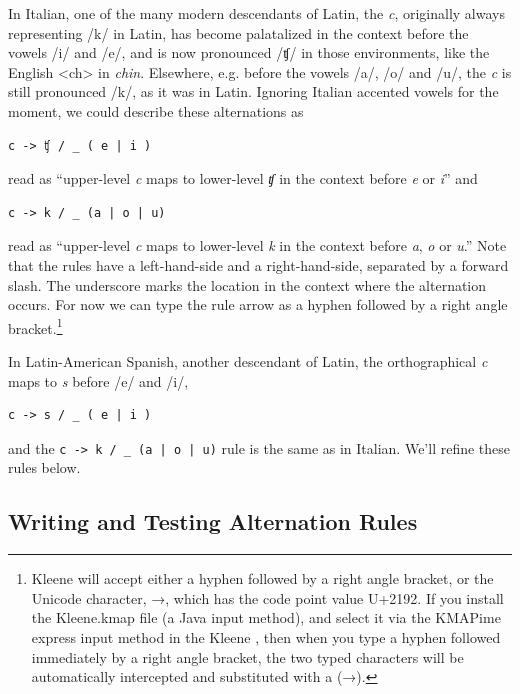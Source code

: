 In Italian, one of the many modern descendants of Latin, the \emph{c},
originally always representing /k/ in Latin, has become palatalized in the context before the vowels /i/ and
/e/, and is now pronounced /ʧ/ in those environments, like the English
<ch> in \emph{chin}.  Elsewhere, e.g.\@
before the vowels /a/, /o/ and /u/, the \emph{c} is still pronounced /k/,
as it was in Latin.  Ignoring Italian accented vowels for the moment, we could
describe these alternations as 

\begin{Verbatim}
c -> ʧ / _ ( e | i )
\end{Verbatim}

\noindent
read as ``upper-level \emph{c} maps to lower-level \emph{ʧ} in the context before \emph{e} or \emph{i}'' and

\begin{Verbatim}
c -> k / _ (a | o | u)
\end{Verbatim}

\noindent
read as ``upper-level \emph{c} maps to lower-level \emph{k} in the context before \emph{a}, \emph{o} or \emph{u}.''
Note that the rules have a left-hand-side and a right-hand-side, separated by a forward slash.  The underscore marks
the location in the context where the alternation occurs.  For now we can type the rule arrow as a hyphen followed by a
right angle bracket.\footnote{Kleene will accept either a hyphen
followed by a right angle bracket, or the Unicode  character, →, which has the code point value U+2192.  If you
install the Kleene.kmap file (a Java input method), and select
it via the KMAPime express input method in the Kleene , then when you type a hyphen followed immediately by a
right angle bracket, the two typed characters will be automatically
intercepted and substituted with a  (→).}

In Latin-American Spanish, another descendant of Latin, the orthographical \emph{c} maps to \emph{s} before /e/ and /i/, 

\begin{Verbatim}
c -> s / _ ( e | i )
\end{Verbatim}

\noindent
and the \verb!c -> k / _ (a | o | u)! rule is the same as in Italian.  We'll refine these rules below.

\subsection{Writing and Testing Alternation Rules}

